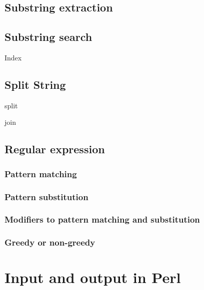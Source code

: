 \documentclass[]{book}
\begin{document}
\hypertarget{substring-extraction}{%
\section{Substring extraction}\label{substring-extraction}}

\hypertarget{substring-search}{%
\section{Substring search}\label{substring-search}}

Index

\hypertarget{split-string}{%
\section{Split String}\label{split-string}}

split

join

\hypertarget{regular-expression}{%
\section{Regular expression}\label{regular-expression}}

\hypertarget{pattern-matching}{%
\subsection{Pattern matching}\label{pattern-matching}}

\hypertarget{pattern-substitution}{%
\subsection{Pattern substitution}\label{pattern-substitution}}

\hypertarget{modifiers-to-pattern-matching-and-substitution}{%
\subsection{Modifiers to pattern matching and substitution}\label{modifiers-to-pattern-matching-and-substitution}}

\hypertarget{greedy-or-non-greedy}{%
\subsection{Greedy or non-greedy}\label{greedy-or-non-greedy}}

\hypertarget{input-and-output-in-perl}{%
\chapter{Input and output in Perl}\label{input-and-output-in-perl}}
\end{document}
